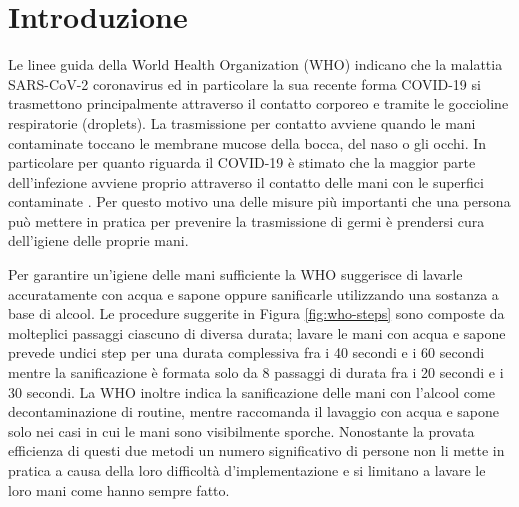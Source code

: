 \chapter{Introduzione}
\label{cap:introduzione}

Le linee guida della World Health Organization (WHO) indicano che la malattia SARS-CoV-2 coronavirus ed in particolare la sua recente forma COVID-19 si trasmettono principalmente attraverso il contatto corporeo e tramite le goccioline respiratorie (droplets). La trasmissione per contatto avviene quando le mani contaminate toccano le membrane mucose della bocca, del naso o gli occhi. In particolare per quanto riguarda il COVID-19 è stimato che la maggior parte dell'infezione avviene proprio attraverso il contatto delle mani con le superfici contaminate \cite{santarpia2020aerosol}. Per questo motivo una delle misure più importanti che una persona può mettere in pratica per prevenire la trasmissione di germi è prendersi cura dell'igiene delle proprie mani.

Per garantire un'igiene delle mani sufficiente la WHO suggerisce di lavarle accuratamente con acqua e sapone oppure sanificarle utilizzando una sostanza a base di alcool.
Le procedure suggerite in Figura \ref{fig:who-steps} sono composte da molteplici passaggi ciascuno di diversa durata; lavare le mani con acqua e sapone prevede undici step per una durata complessiva fra 
i 40 secondi e i 60 secondi mentre la sanificazione è formata solo da 8 passaggi di durata fra i 20 secondi e i 30 secondi. 
La WHO inoltre indica la sanificazione delle mani con l'alcool come decontaminazione di routine, mentre raccomanda il lavaggio con acqua e sapone solo nei casi in cui le mani sono visibilmente sporche.
Nonostante la provata efficienza di questi due metodi un numero significativo di persone non li mette in pratica a causa della loro difficoltà d'implementazione e si limitano a lavare le loro mani come hanno sempre fatto.

